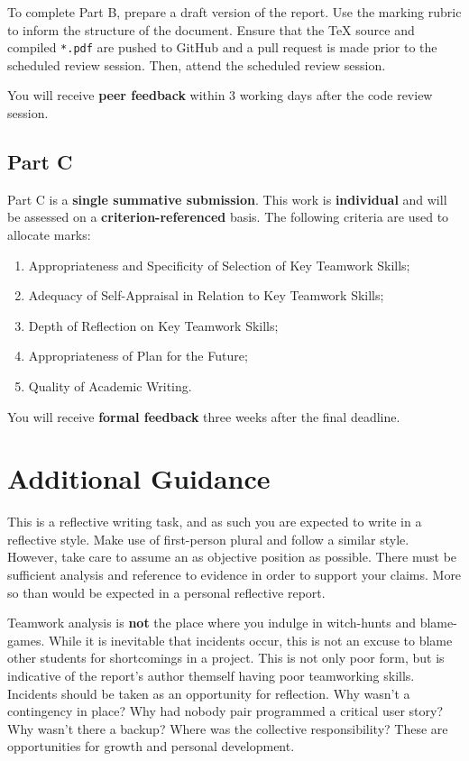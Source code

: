 \documentclass{../fal_assignment}
\begin{document}
To complete Part B, prepare a draft version of the report. Use the marking rubric to inform the structure of the document. Ensure that the TeX source and compiled \texttt{*.pdf} are pushed to GitHub and a pull request is made prior to the scheduled review session. Then, attend the scheduled review session.

You will receive \textbf{peer feedback} within 3 working days after the code review session.

\subsection*{Part C}

Part C is a \textbf{single summative submission}. This work is \textbf{individual} and will be assessed on a \textbf{criterion-referenced} basis. The following criteria are used to allocate marks:

\begin{enumerate}[label=(\alph*)]
	\item Appropriateness and Specificity of Selection of Key Teamwork Skills;
	\item Adequacy of Self-Appraisal in Relation to Key Teamwork Skills;
	\item Depth of Reflection on Key Teamwork Skills;
	\item Appropriateness of Plan for the Future;
	\item Quality of Academic Writing.
\end{enumerate}

You will receive \textbf{formal feedback} three weeks after the final deadline.

\section*{Additional Guidance}

This is a reflective writing task, and as such you are expected to write in a reflective style. Make use of first-person plural and follow a similar style. However, take care to assume an as objective position as possible. There must be sufficient analysis and reference to evidence in order to support your claims. More so than would be expected in a personal reflective report.

Teamwork analysis is \textbf{not} the place where you indulge in witch-hunts and blame-games. While it is inevitable that incidents occur, this is not an excuse to blame other students for shortcomings in a project. This is not only poor form, but is indicative of the report's author themself having poor teamworking skills. Incidents should be taken as an opportunity for reflection. Why wasn't a contingency in place? Why had nobody pair programmed a critical user story? Why wasn't there a backup? Where was the collective responsibility? These are opportunities for growth and personal development.
\end{document}
